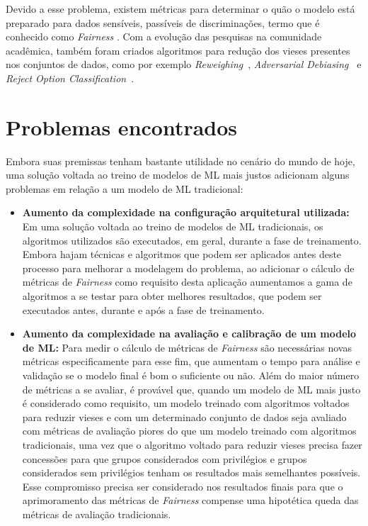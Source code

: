 \documentclass[Portugues,Final]{ic-tese-v3}
\begin{document}
Devido a esse problema, existem métricas para determinar o quão o modelo está preparado para dados sensíveis, passíveis de discriminações, termo que é conhecido como \textit{Fairness} \cite{Begley_2021}. Com a evolução das pesquisas na comunidade acadêmica, também foram criados algoritmos para redução dos vieses presentes nos conjuntos de dados, como por exemplo \textit{Reweighing}~\cite{Kamiran_2011}, \textit{Adversarial Debiasing}~\cite{Zhang_2018} e \textit{Reject Option Classification}~\cite{Kamiran_2012}.

\section{Problemas encontrados}

Embora suas premissas tenham bastante utilidade no cenário do mundo de hoje, uma solução voltada ao treino de modelos de ML mais justos adicionam alguns problemas em relação a um modelo de ML tradicional:

\begin{itemize}
\item \textbf{Aumento da complexidade na configuração arquitetural utilizada:} Em uma solução voltada ao treino de modelos de ML tradicionais, os algoritmos utilizados são executados, em geral, durante a fase de treinamento. Embora hajam técnicas e algoritmos que podem ser aplicados antes deste processo para melhorar a modelagem do problema, ao adicionar o cálculo de métricas de \textit{Fairness} como requisito desta aplicação aumentamos a gama de algoritmos a se testar para obter melhores resultados, que podem ser executados antes, durante e após a fase de treinamento.
\item \textbf{Aumento da complexidade na avaliação e calibração de um modelo de ML:} Para medir o cálculo de métricas de \textit{Fairness} são necessárias novas métricas especificamente para esse fim, que aumentam o tempo para análise e validação se o modelo final é bom o suficiente ou não. Além do maior número de métricas a se avaliar, é provável que, quando um modelo de ML mais justo é considerado como requisito, um modelo treinado com algoritmos voltados para reduzir vieses e com um determinado conjunto de dados seja avaliado com métricas de avaliação piores do que um modelo treinado com algoritmos tradicionais, uma vez que o algoritmo voltado para reduzir vieses precisa fazer concessões para que grupos considerados com privilégios e grupos considerados sem privilégios tenham os resultados mais semelhantes possíveis. Esse compromisso precisa ser considerado nos resultados finais para que o aprimoramento das métricas de \textit{Fairness} compense uma hipotética queda das métricas de avaliação tradicionais.
\end{itemize}
\end{document}
